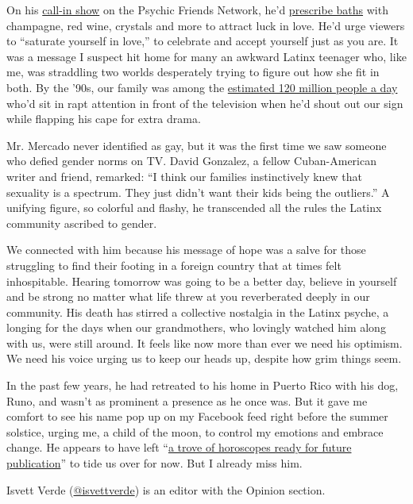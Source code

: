 On his \href{https://www.youtube.com/watch?v=gRmNxqZWl-Q}{call-in show}
on the Psychic Friends Network, he'd
\href{https://www.youtube.com/watch?v=kMW9BnjILpU\&t=111s}{prescribe
baths} with champagne, red wine, crystals and more to attract luck in
love. He'd urge viewers to ``saturate yourself in love,'' to celebrate
and accept yourself just as you are. It was a message I suspect hit home
for many an awkward Latinx teenager who, like me, was straddling two
worlds desperately trying to figure out how she fit in both. By the
'90s, our family was among the
\href{https://www.historymiami.org/exhibition/walter-mercado/}{estimated
120 million people a day} who'd sit in rapt attention in front of the
television when he'd shout out our sign while flapping his cape for
extra drama.

Mr. Mercado never identified as gay, but it was the first time we saw
someone who defied gender norms on TV. David Gonzalez, a fellow
Cuban-American writer and friend, remarked: ``I think our families
instinctively knew that sexuality is a spectrum. They just didn't want
their kids being the outliers.'' A unifying figure, so colorful and
flashy, he transcended all the rules the Latinx community ascribed to
gender.

We connected with him because his message of hope was a salve for those
struggling to find their footing in a foreign country that at times felt
inhospitable. Hearing tomorrow was going to be a better day, believe in
yourself and be strong no matter what life threw at you reverberated
deeply in our community. His death has stirred a collective nostalgia in
the Latinx psyche, a longing for the days when our grandmothers, who
lovingly watched him along with us, were still around. It feels like now
more than ever we need his optimism. We need his voice urging us to keep
our heads up, despite how grim things seem.

In the past few years, he had retreated to his home in Puerto Rico with
his dog, Runo, and wasn't as prominent a presence as he once was. But it
gave me comfort to see his name pop up on my Facebook feed right before
the summer solstice, urging me, a child of the moon, to control my
emotions and embrace change. He appears to have left
``\href{https://www.miamiherald.com/news/nation-world/world/americas/article236994414.html}{a
trove of horoscopes ready for future publication}'' to tide us over for
now. But I already miss him.

Isvett Verde
(\href{https://twitter.com/isvettverde?lang=en}{@isvettverde}) is an
editor with the Opinion section.

